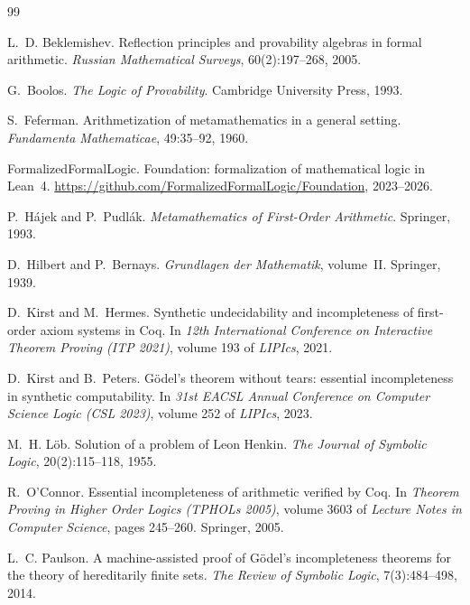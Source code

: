\documentclass[11pt]{article}
\theoremstyle{plain}
\theoremstyle{definition}
\theoremstyle{remark}
\begin{document}

\begin{thebibliography}{99}

L.~D. Beklemishev.
\newblock Reflection principles and provability algebras in formal
  arithmetic.
\newblock \emph{Russian Mathematical Surveys}, 60(2):197--268, 2005.

G.~Boolos.
\newblock \emph{The Logic of Provability}.
\newblock Cambridge University Press, 1993.

S.~Feferman.
\newblock Arithmetization of metamathematics in a general setting.
\newblock \emph{Fundamenta Mathematicae}, 49:35--92, 1960.

FormalizedFormalLogic.
\newblock Foundation: formalization of mathematical logic in {L}ean~4.
\newblock \url{https://github.com/FormalizedFormalLogic/Foundation},
  2023--2026.

P.~H{\'a}jek and P.~Pudl{\'a}k.
\newblock \emph{Metamathematics of First-Order Arithmetic}.
\newblock Springer, 1993.

D.~Hilbert and P.~Bernays.
\newblock \emph{Grundlagen der Mathematik}, volume~II.
\newblock Springer, 1939.

D.~Kirst and M.~Hermes.
\newblock Synthetic undecidability and incompleteness of first-order axiom
  systems in {Coq}.
\newblock In \emph{12th International Conference on Interactive Theorem
  Proving (ITP 2021)}, volume 193 of \emph{LIPIcs}, 2021.

D.~Kirst and B.~Peters.
\newblock G{\"o}del's theorem without tears: essential incompleteness in
  synthetic computability.
\newblock In \emph{31st EACSL Annual Conference on Computer Science Logic
  (CSL 2023)}, volume 252 of \emph{LIPIcs}, 2023.

M.~H. L{\"o}b.
\newblock Solution of a problem of {L}eon {H}enkin.
\newblock \emph{The Journal of Symbolic Logic}, 20(2):115--118, 1955.

R.~O'Connor.
\newblock Essential incompleteness of arithmetic verified by {Coq}.
\newblock In \emph{Theorem Proving in Higher Order Logics (TPHOLs 2005)},
  volume 3603 of \emph{Lecture Notes in Computer Science}, pages 245--260.
  Springer, 2005.

L.~C. Paulson.
\newblock A machine-assisted proof of {G}{\"o}del's incompleteness theorems
  for the theory of hereditarily finite sets.
\newblock \emph{The Review of Symbolic Logic}, 7(3):484--498, 2014.


\end{thebibliography}
\end{document}
